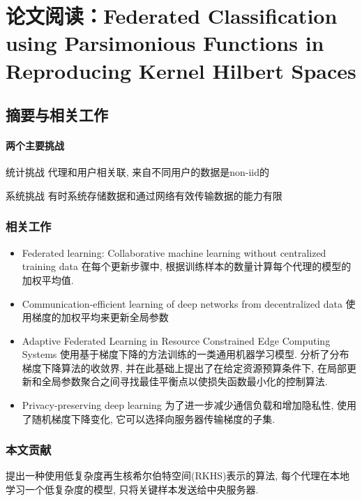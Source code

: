 \section{论文阅读：Federated Classification using Parsimonious Functions in Reproducing Kernel Hilbert Spaces}

\subsection{摘要与相关工作}

\paragraph{两个主要挑战}

统计挑战 代理和用户相关联, 来自不同用户的数据是non-iid的


系统挑战 有时系统存储数据和通过网络有效传输数据的能力有限


\subsubsection{相关工作}
\begin{itemize}
    \item Federated learning: Collaborative machine learning without centralized training data\cite{mcmahan2016communication}  在每个更新步骤中, 根据训练样本的数量计算每个代理的模型的加权平均值.
    \item Communication-efficient learning of deep networks from decentralized data\cite{mcmahan2016communication}
          使用梯度的加权平均来更新全局参数
    \item Adaptive Federated Learning in Resource Constrained Edge Computing Systems \cite{wang2019adaptive, yu2019parallel}使用基于梯度下降的方法训练的一类通用机器学习模型. 分析了分布梯度下降算法的收敛界, 并在此基础上提出了在给定资源预算条件下, 在局部更新和全局参数聚合之间寻找最佳平衡点以使损失函数最小化的控制算法.
    \item Privacy-preserving deep learning \cite{shokri2015privacy}为了进一步减少通信负载和增加隐私性, 使用了随机梯度下降变化, 它可以选择向服务器传输梯度的子集.
\end{itemize}

\subsubsection{本文贡献}

提出一种使用低复杂度再生核希尔伯特空间(RKHS)表示的算法, 每个代理在本地学习一个低复杂度的模型, 只将关键样本发送给中央服务器.


